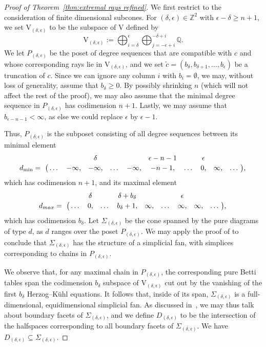 \documentclass[12pt]{amsart}
\theoremstyle{definition}
\theoremstyle{remark}
\newcommand{\ZZ}{\mathbb{Z}}
\newcommand{\QQ}{\mathbb{Q}}
\newcommand{\VV}{\mathrm{V}}
\newcommand{\bb}{c}
\newcommand{\dd}{d}
\newcommand{\nothing}{\emptyset}
\begin{document}
\begin{proof}[Proof of Theorem~\ref{thm:extremal rays refined}]
We first restrict to the consideration of finite dimensional subcones.  For $(\delta,\epsilon)\in \ZZ^2$ with $\epsilon-\delta\geq n+1$, we set $\VV_{(\delta,\epsilon)}$ to be the subspace of $\VV$ defined by
\[
\VV_{(\delta,\epsilon)}:=\bigoplus_{i=\delta}^\epsilon \bigoplus_{j=-\epsilon +i}^{-\delta+i} \QQ.
\]
We let $P_{(\delta,\epsilon)}$ be the poset of degree sequences that are compatible with $\bb$ and whose corresponding rays lie in $\VV_{(\delta,\epsilon)}$, and we set $\widetilde{\bb}=(b_{\delta},b_{\delta+1},\dots, b_{\epsilon})$ be a truncation of $\bb$.  Since we can ignore any column $i$ with $b_i=\nothing$, we may, without loss of generality, assume that $b_\delta \geq 0$.  By possibly shrinking $n$ (which will not affect the rest of the proof), we may also assume that the minimal degree sequence in $P_{(\delta,\epsilon)}$ has codimension $n+1$.  Lastly, we may assume that $b_{\epsilon-n-1}<\infty$, as else we could replace $\epsilon$ by $\epsilon-1$.

Thus, $P_{(\delta,\epsilon)}$ is the subposet consisting of all degree sequences between its minimal element 
\[\bordermatrix{&&&\delta&&&\epsilon-n-1&&\epsilon &&\cr
              d_{\min}= &\dots&-\infty,&-\infty,&\dots&-\infty,&-n-1,&\dots &0, &\infty,&\dots\cr},
              \]
              which has codimension $n+1$, and its maximal element
\[\bordermatrix{&&\delta&&\delta+b_\delta&&&\epsilon &&\cr
              d_{max}= &\dots&0,&\dots&b_{\delta}+1,&\infty,&\dots &\infty,&\infty,&\dots\cr},\]
              which has codimension $b_{\delta}$.
Let $\Sigma_{(\delta,\epsilon)}$ be the cone spanned by the pure diagrams of type $\dd$, as $\dd$ ranges over the poset $P_{(\delta,\epsilon)}$.  We may apply the proof of  \cite[Proposition~2.9]{boij-sod1} to conclude that $\Sigma_{(\delta,\epsilon)}$ has the structure of a simplicial fan, with simplices corresponding to chains in $P_{(\delta,\epsilon)}$.

We observe that, for any maximal chain in $P_{(\delta,\epsilon)}$, the corresponding pure Betti tables span the codimension $b_{\delta}$ subspace of $\VV_{(\delta,\epsilon)}$ cut out by the vanishing of the first $b_{\delta}$ Herzog--K\"uhl equations.
It follows that, inside of its span, $\Sigma_{(\delta,\epsilon)}$ is a full-dimensional, equidimensional simplicial fan.  
As discussed in~\cite[Appendix]{bbeg}, we may thus talk about boundary facets of $\Sigma_{(\delta,\epsilon)}$, and we define $D_{(\delta,\epsilon)}$ to be the intersection of the halfspaces corresponding to all boundary facets of $\Sigma_{(\delta,\epsilon)}$.  We have $D_{(\delta,\epsilon)} \subseteq \Sigma_{(\delta,\epsilon)}$.


\end{proof}
\end{document}
